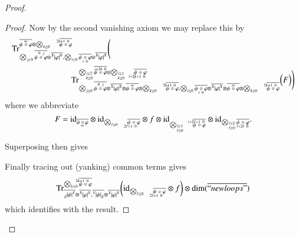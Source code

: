 \documentclass{amsart}
\def\tn{\textnormal}
\def\dim{\tn{dim}}
\def\Trace{\tn{Tr}}
\def\ol{\overline}
\def\id{\tn{id}}
\newcommand{\feeddd}[3]{{\tensor*[^{#2}_{\color{white}{!}}]{{|#1|}}{^{#3}}}}%
\newcommand{\feeddc}[3]{{\tensor*[^{#2}]{{|#1|}}{_{#3}}}}
\newcommand{\feedcd}[3]{{\tensor*[_{#2}]{{|#1|}}{^{#3}}}}
\theoremstyle{remark}
\theoremstyle{definition}
\begin{document}
\begin{proof}
\begin{proof}
Now by the second vanishing axiom we may replace this by
\begin{align*}
&\Trace^{\ol{\psi\;\accentset{\infty}{\circ}\;\varphi}\otimes\bigotimes_{k\ge0}\quad\ol{\psi\;\accentset{2k+1\ 0\ \ \ }{\circ}\;\varphi}}_{\bigotimes_{j\ge0}\ol{\psi\;\accentset{\,0\ j}{\circ}\;\varphi}\otimes\ol{\feeddd{\varphi}{X}{X}},\bigotimes_{i\ge0}\ol{\psi\;\underaccent{\,i\ 0}{\circ}\;\varphi}\otimes\ol{\feeddd{\varphi}{X}{X}}}
\Bigg(\\
&\hspace{1in}\Trace^{\bigotimes_{\substack{\scriptscriptstyle i\ge2\\ \scriptscriptstyle k\ge0}}\ol{\psi\;\accentset{i+2k\ 0}{\circ}\;\varphi}\otimes\bigotimes_{\substack{\scriptscriptstyle i\ge1\\ \scriptscriptstyle k\ge0}}\quad\ol{\psi\;\underaccent{i+2k+1\ 0\ \ \ }{\circ}\;\varphi}}_{\bigotimes_{j\ge0}\ol{\psi\;\accentset{\,0\ j}{\circ}\;\varphi}\otimes\ol{\feeddd{\varphi}{X}{X}}\otimes\ol{\psi\;\accentset{\infty}{\circ}\;\varphi}\otimes\bigotimes_{k\ge0}\quad\ol{\psi\;\accentset{2k+1\ 0\ \ \ }{\circ}\;\varphi},\bigotimes_{i\ge0}\ol{\psi\;\underaccent{\,i\ 0}{\circ}\;\varphi}\otimes\ol{\feeddd{\varphi}{X}{X}}\otimes\ol{\psi\;\accentset{\infty}{\circ}\;\varphi}\otimes\bigotimes_{k\ge0}\quad\ol{\psi\;\accentset{2k+1\ 0\ \ \ }{\circ}\;\varphi}}
\Big(F\Big)\Bigg)
\end{align*}
where we abbreviate
\[F=\id_{\ol{\psi\,\underaccent{\,\infty}{\circ}\,\varphi}}\otimes\id_{\bigotimes_{\ell\ge0}\quad\ol{\psi\;\underaccent{2\ell+1\ 0\ \ \ }{\circ}\;\varphi}}\otimes f\otimes \id_{\bigotimes_{\substack{\scriptscriptstyle i\ge1\\ \scriptscriptstyle \ell\ge0}}\quad\ol{\psi\;\accentset{i+2\ell+1\ 0\ \ \ }{\circ}\;\varphi}}\otimes \id_{\bigotimes_{\substack{\scriptscriptstyle i\ge2\\ \scriptscriptstyle \ell\ge0}}\ol{\psi\;\underaccent{i+2\ell\ 0}{\circ}\;\varphi}}.\]

Superposing then gives
\[\]

Finally tracing out (yanking) common terms gives 
\[\Trace^{\bigotimes_{k\ge0}\ol{\psi\;\accentset{2k+1\ 0\ \ \ \,}{\circ}\;\varphi}}_{\ol{\feedcd{\psi}{Z}{Y}}\otimes\ol{\feeddd{\varphi}{X}{X}},\ol{\feeddc{\psi}{Y}{Z}}\otimes\ol{\feeddd{\varphi}{X}{X}}}
\bigg(
\id_{\bigotimes_{\ell\ge0}\quad\ol{\psi\;\underaccent{2\ell+1\ 0\ \ \ }{\circ}\;\varphi}}\otimes f
\bigg)\otimes\dim(\ol{``newloops"})\]
which identifies with the result.
\end{proof}


\end{proof}
\end{document}
